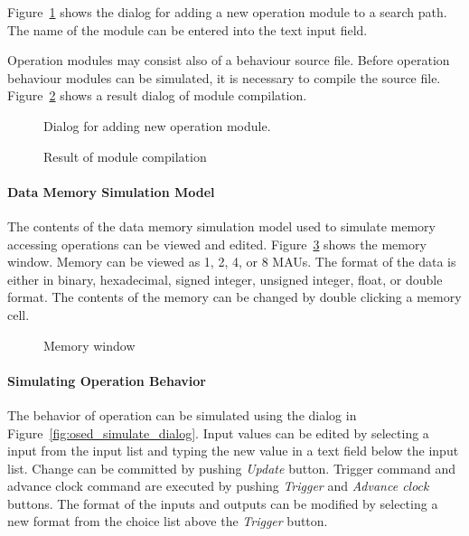 \documentclass[a4paper,twoside]{tceusermanual}
\begin{document}
Figure~\ref{fig:osed_add_module_dialog} shows the dialog for adding a new
operation module to a search path. The name of the module can be entered
into the text input field.  

Operation modules may consist also of a behaviour source file. Before
operation behaviour modules can be simulated, it is necessary to compile the
source file.  Figure~\ref{fig:osed_build_result_dialog} shows a result dialog of
module compilation. 

%
\begin{figure}[tb]
\centerline{}
\caption{Dialog for adding new operation module.}
\label{fig:osed_add_module_dialog}
\end{figure}
%
\begin{figure}[tb]
\centerline{}
\caption{Result of module compilation}
\label{fig:osed_build_result_dialog}
\end{figure}

\paragraph{Data Memory Simulation Model}

The contents of the data memory simulation model used to simulate
memory accessing operations can be viewed and edited.
Figure~\ref{fig:osed_memory_dialog}
shows the memory window. Memory can be viewed as 1, 2, 4, or 8 MAUs.
The format of the data is either in binary, hexadecimal, signed integer,
unsigned integer, float, or double format.
The contents of the memory can be changed by double clicking a memory cell. 

\begin{figure}[tb]
\centerline{}
\caption{Memory window}
\label{fig:osed_memory_dialog}
\end{figure}

\paragraph{Simulating Operation Behavior}

The behavior of operation can be simulated using the dialog in 
Figure~\ref{fig:osed_simulate_dialog}. Input values can be edited by selecting
a input from the input list and typing the new value in a text field below
the input list. Change can be committed by pushing \emph{Update} button.
Trigger command and advance clock command are executed 
by pushing \emph{Trigger} and \emph{Advance clock} buttons.
The format of the inputs and outputs can be modified by selecting a new format
from the choice list above the \emph{Trigger} button.
\end{document}
